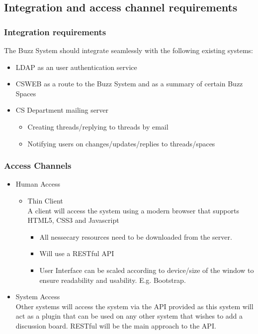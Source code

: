 
\subsection{Integration and access channel requirements}
	\subsubsection{Integration requirements}
		The Buzz System should integrate seamlessly with the following existing systems:		
		\begin{itemize}
			\item LDAP as an user authentication service
			\item CSWEB as a route to the Buzz System and as a summary of certain Buzz Spaces
			\item CS Department mailing server
				\begin{itemize}
					\item Creating threads/replying to threads by email 
					\item Notifying users on changes/updates/replies to threads/spaces
				\end{itemize}
		\end{itemize}
	\subsubsection{Access Channels}
		\begin{itemize}
			\item Human Access
				\begin{itemize}
					\item Thin Client\\
					A client will access the system using a modern browser that supports HTML5, CSS3 and Javascript 
						\begin{itemize}
							\item All nessecary resources need to be downloaded from the server.
							\item Will use a RESTful API 
							\item User Interface can be scaled according to device/size of the window to ensure readability and usability. E.g. Bootstrap.
						\end{itemize}
				\end{itemize}
			\item System Access\\
			Other systems will access the system via the API provided as this system will act as a plugin that can be used on any other system that wishes to add a discussion board. RESTful will be the main approach to the API.
		\end{itemize}